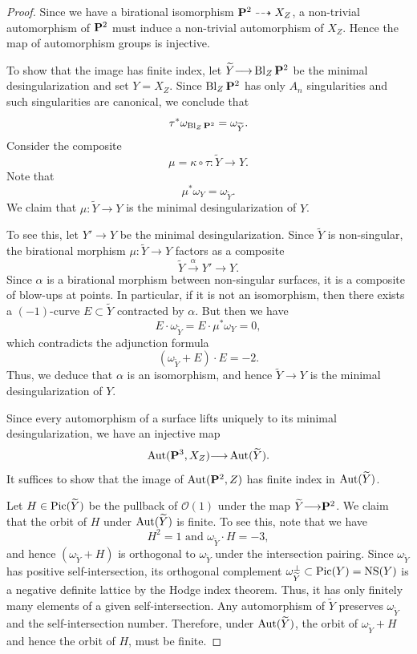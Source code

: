 \documentclass[12pt,reqno]{amsart}
\DeclareMathOperator{\Bl}{Bl}
\renewcommand{\to}{{\longrightarrow}}
\numberwithin{equation}{section}
\renewcommand{\O}{\mathcal O}
\begin{document}
\begin{proof}
  Since we have a birational isomorphism $\P^2 \dashrightarrow X_Z$, a non-trivial automorphism of $\P^2$ must induce a non-trivial automorphism of $X_Z$.
  Hence the map of automorphism groups is injective.

  To show that the image has finite index, let $\widetilde Y \to \Bl_Z\P^2$ be the minimal desingularization and set $Y = X_Z$.
  Since $\Bl_Z\P^2$ has only $A_n$ singularities and such singularities are canonical, we conclude that
  \[\tau^* \omega_{\Bl_Z\P^2} = \omega_{\widetilde Y}.\]
  Consider the composite
  \[\mu = \kappa \circ \tau \colon \widetilde Y \to Y.\]
  Note that
  \[ \mu^* \omega_Y = \omega_{\widetilde Y}.\]
  We claim that $\mu \colon \widetilde Y \to Y$ is the minimal desingularization of $Y$.

  To see this, let $Y' \to Y$ be the minimal desingularization.
  Since $\widetilde Y$ is non-singular, the birational morphism $\mu \colon \widetilde Y \to Y$ factors as a composite
  \[ \widetilde Y \xrightarrow{\alpha} Y' \to Y.\]
  Since $\alpha$ is a birational morphism between non-singular surfaces, it is a composite of blow-ups at points.
  In particular, if it is not an isomorphism, then there exists a $(-1)$-curve $E \subset \widetilde Y$ contracted by $\alpha$.
  But then we have 
  \[ E \cdot \omega_{\widetilde Y} = E \cdot \mu^* \omega_Y = 0,\]
  which contradicts the adjunction formula
  \[ \left(\omega_{\widetilde Y}+ E\right) \cdot E = -2.\]
  Thus, we deduce that $\alpha$ is an isomorphism, and hence $\widetilde Y \to Y$ is the minimal desingularization of $Y$.
  
  Since every automorphism of a surface lifts uniquely to its minimal
  desingularization, we have an injective map
  \[ \Aut(\P^3, X_Z) \to \Aut(\widetilde Y).\]
  It suffices to show that the image of $\Aut(\P^2, Z)$ has finite index in $\Aut(\widetilde Y)$.

  Let $H \in \Pic(\widetilde Y)$ be the pullback of $\O(1)$ under the map $\widetilde Y \to \P^2$.
  We claim that the orbit of $H$ under $\Aut(\widetilde Y)$ is finite.
  To see this, note that we have
  \[ H^2 = 1 \text{ and } \omega_{\widetilde Y} \cdot H = -3, \]
  and hence $(\omega_{\widetilde Y} + H)$ is orthogonal to $\omega_{\widetilde Y}$ under the intersection pairing.
  Since $\omega_{\widetilde Y}$ has positive self-intersection, its orthogonal complement $\omega_{\widetilde Y}^\perp \subset \Pic(Y) = {\rm NS}(Y)$ is a negative definite lattice by the Hodge index theorem.
  Thus, it has only finitely many elements of a given self-intersection.
  Any automorphism of $\widetilde Y$ preserves $\omega_{\widetilde Y}$ and the self-intersection number.
  Therefore, under $\Aut(\widetilde Y)$, the orbit of $\omega_{\widetilde Y} + H$ and hence the orbit of $H$, must be finite.


\end{proof}
\end{document}
